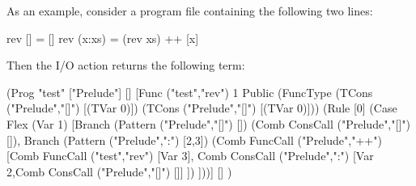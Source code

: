 {As an example, consider a program file 
containing the following two lines:
\begin{curry}
rev []     = []
rev (x:xs) = (rev xs) ++ [x]
\end{curry}
Then the I/O action  returns the
following term:
\begin{curry}
 (Prog "test"
  ["Prelude"]
  []
  [Func ("test","rev") 1 Public
        (FuncType (TCons ("Prelude","[]") [(TVar 0)])
                  (TCons ("Prelude","[]") [(TVar 0)]))
        (Rule [0]
           (Case Flex (Var 1)
              [Branch (Pattern ("Prelude","[]") [])
                  (Comb ConsCall ("Prelude","[]") []),
               Branch (Pattern ("Prelude",":") [2,3])
                  (Comb FuncCall ("Prelude","++")
                        [Comb FuncCall ("test","rev") [Var 3],
                         Comb ConsCall ("Prelude",":")
                              [Var 2,Comb ConsCall ("Prelude","[]") []]
                        ])
              ]))]
  []
 )
\end{curry}



\newcommand{\currymodule}[1]{\subsubsection{Library #1}\label{Library:#1}}
\newcommand{\currytypesstart}{\subsubsection*{Exported types:}}
\newcommand{\currytypesstop}{}
\newcommand{\currytypesynstart}[2]{{\tt type #2}\pindex{#1} \begin{quote}}
\newcommand{\currytypesynstop}{\end{quote}}
\newcommand{\currydatastart}[1]{{\tt data #1}\pindex{#1} \begin{quote}}
\newcommand{\currydatacons}{\end{quote}%
\begin{itemize}\item[] \hspace{-4ex}\emph{Exported constructors:}}
\newcommand{\currydatastop}{\end{itemize}}
\newcommand{\curryconsstart}[2]{\item {\tt #1~::~#2}\par}
\newcommand{\curryfuncstart}{\subsubsection*{Exported functions:}}
\newcommand{\curryfuncstop}{}
\newcommand{\curryfunctionstart}[2]{#2\pindex{#1}\begin{quote}}
\newcommand{\curryfunctionstop}{\end{quote}}
\newcommand{\curryfuncsig}[2]{{\tt #1~::~#2}}


}
